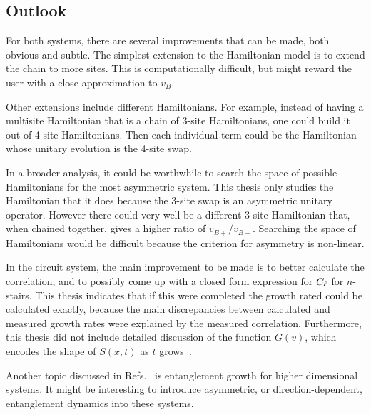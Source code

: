 \subsection{Outlook}

For both systems, there are several improvements that can be made, both obvious and subtle. The simplest extension to the Hamiltonian model is to extend the chain to more sites. This is computationally difficult, but might reward the user with a close approximation to $v_B$. 

Other extensions include different Hamiltonians. For example, instead of having a multisite Hamiltonian that is a chain of 3-site Hamiltonians, one could build it out of 4-site Hamiltonians. Then each individual term could be the Hamiltonian whose unitary evolution is the 4-site swap. 

In a broader analysis, it could be worthwhile to search the space of possible Hamiltonians for the most asymmetric system. This thesis only studies the Hamiltonian that it does because the 3-site swap is an asymmetric unitary operator. However there could very well be a different 3-site Hamiltonian that, when chained together, gives a higher ratio of $v_{B+}/v_{B-}$. Searching the space of Hamiltonians would be difficult because the criterion for asymmetry is non-linear.

In the circuit system, the main improvement to be made is to better calculate the correlation, and to possibly come up with a closed form expression for $C_\ell$ for $n$-stairs. This thesis indicates that if this were completed the growth rated could be calculated exactly, because the main discrepancies between calculated and measured growth rates were explained by the measured correlation. Furthermore, this thesis did not include detailed discussion of the  function $G(v)$, which encodes the shape of $S(x,t)$ as $t$ grows~\cite{Jonay17}.

Another topic discussed in Refs.~\cite{Nahum2017, Jonay18} is entanglement growth for higher dimensional systems. It might be interesting to introduce asymmetric, or direction-dependent, entanglement dynamics into these systems.